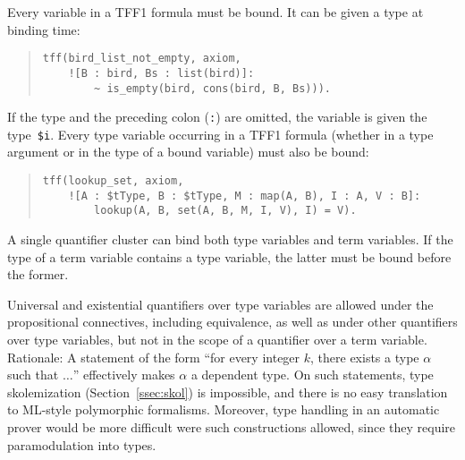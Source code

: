 Every variable in a TFF1 formula must be bound. It can be given a type at
binding time:
\begin{quote}
\begin{verbatim}
tff(bird_list_not_empty, axiom,
    ![B : bird, Bs : list(bird)]:
        ~ is_empty(bird, cons(bird, B, Bs))).
\end{verbatim}
\end{quote}
If the type and the preceding colon ({\tt :}) are omitted, the variable is given
the type~\verb+$i+. Every type variable occurring in a TFF1 formula
(whether in a type argument or in the type of a bound variable)
must also be bound:
\begin{quote}
\begin{verbatim}
tff(lookup_set, axiom,
    ![A : $tType, B : $tType, M : map(A, B), I : A, V : B]:
        lookup(A, B, set(A, B, M, I, V), I) = V).
\end{verbatim}
\end{quote}
A single quantifier cluster can bind both type variables and term variables. If
the type of a term variable contains a type variable, the latter must be bound
before the former.



Universal and existential quantifiers over type variables are allowed under the
propositional connectives, including equivalence, as well as under other
quantifiers over type variables, but not in the scope of a quantifier over a
term variable.
Rationale: A statement of the form ``for every integer $k$, there exists a type
$\alpha$ such that $\ldots$'' effectively makes $\alpha$ a dependent type.
On such statements, type skolemization (Section~\ref{ssec:skol}) is impossible,
and there is no easy translation to ML-style polymorphic formalisms.
Moreover, type handling in an automatic prover would be more difficult were
such constructions allowed, since they require paramodulation into types.

